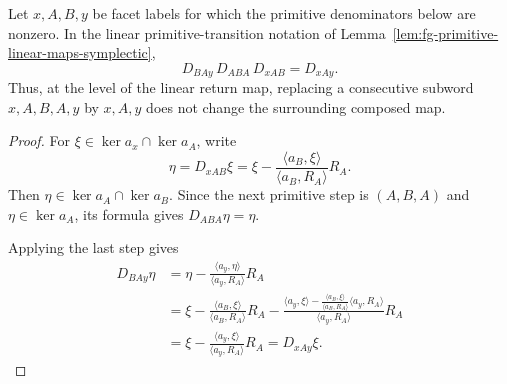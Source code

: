 \begin{unverified}
\begin{lemma}%
\label{lem:fg-return-determinant-contraction}
Let \(x,A,B,y\) be facet labels for which the primitive denominators below are
nonzero.  In the linear primitive-transition notation of
Lemma~\ref{lem:fg-primitive-linear-maps-symplectic},
\[
  D_{BAy}\,D_{ABA}\,D_{xAB} = D_{xAy}.
\]
Thus, at the level of the linear return map, replacing a consecutive subword
\(x,A,B,A,y\) by \(x,A,y\) does not change the surrounding composed map.
\end{lemma}

\begin{proof}
For \(\xi\in\ker a_x\cap\ker a_A\), write
\[
  \eta = D_{xAB}\xi
  =
  \xi
  -
  \frac{\langle a_B,\xi\rangle}{\langle a_B,R_A\rangle}R_A .
\]
Then \(\eta\in\ker a_A\cap\ker a_B\).  Since the next primitive step is
\((A,B,A)\) and \(\eta\in\ker a_A\), its formula gives
\(D_{ABA}\eta=\eta\).

Applying the last step gives
\[
\begin{aligned}
  D_{BAy}\eta
  &=
  \eta
  -
  \frac{\langle a_y,\eta\rangle}{\langle a_y,R_A\rangle}R_A  \\
  &=
  \xi
  -
  \frac{\langle a_B,\xi\rangle}{\langle a_B,R_A\rangle}R_A
  -
  \frac{
    \langle a_y,\xi\rangle
    -
    \frac{\langle a_B,\xi\rangle}{\langle a_B,R_A\rangle}
    \langle a_y,R_A\rangle}
  {\langle a_y,R_A\rangle}R_A  \\
  &=
  \xi
  -
  \frac{\langle a_y,\xi\rangle}{\langle a_y,R_A\rangle}R_A
  =
  D_{xAy}\xi .
\end{aligned}
\]
\end{proof}
\end{unverified}


